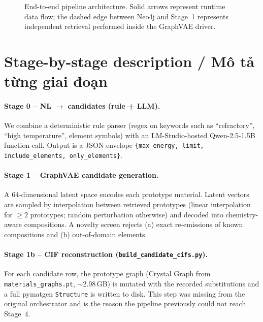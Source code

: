 \documentclass[11pt,a4paper]{report}
\begin{document}
\begin{figure}[h]
\caption{End-to-end pipeline architecture. Solid arrows represent runtime data flow;
  the dashed edge between Neo4j and Stage~1 represents independent retrieval performed
  inside the GraphVAE driver.}
\label{fig:architecture}
\end{figure}

\section{Stage-by-stage description / Mô tả từng giai đoạn}

\paragraph{Stage 0 -- NL $\to$ candidates (rule + LLM).}
We combine a deterministic rule parser (regex on keywords such as ``refractory'', ``high
temperature'', element symbols) with an LM-Studio-hosted Qwen-2.5-1.5B function-call. Output
is a JSON envelope \texttt{\{max\_energy, limit, include\_elements, only\_elements\}}.

\paragraph{Stage 1 -- GraphVAE candidate generation.}
A 64-dimensional latent space encodes each prototype material. Latent vectors are sampled by
interpolation between retrieved prototypes (linear interpolation for $\geq 2$ prototypes;
random perturbation otherwise) and decoded into chemistry-aware compositions. A novelty
screen rejects (a) exact re-emissions of known compositions and (b) out-of-domain elements.

\paragraph{Stage 1b -- CIF reconstruction (\texttt{build\_candidate\_cifs.py}).}
For each candidate row, the prototype graph (Crystal Graph from
\texttt{materials\_graphs.pt}, $\sim$2.98\,GB) is mutated with the recorded substitutions
and a full pymatgen \texttt{Structure} is written to disk. This step was missing from the
original orchestrator and is the reason the pipeline previously could not reach Stage~4.
\end{document}
